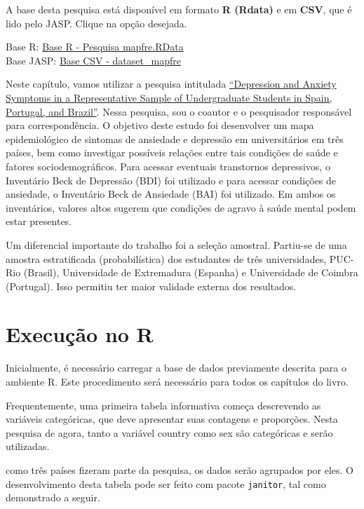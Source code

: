\documentclass[
]{book}
\begin{document}
A base desta pesquisa está disponível em formato \textbf{R (Rdata)} e em \textbf{CSV}, que é lido pelo JASP. Clique na opção desejada.

Base R: \href{https://github.com/anovabr/mqt/raw/master/bases/Base\%20R\%20-\%20Pesquisa\%20mapfre.RData}{Base R - Pesquisa mapfre.RData}\\
Base JASP: \href{https://github.com/anovabr/mqt/raw/master/bases/bases_csv_jasp.zip}{Base CSV - dataset\_mapfre}

Neste capítulo, vamos utilizar a pesquisa intitulada \href{https://doi.org/10.1590/0102.3772e36412}{``Depression and Anxiety Symptoms in a Representative Sample of Undergraduate Students in Spain, Portugal, and Brazil''}. Nessa pesquisa, sou o coautor e o pesquisador responsável para correspondência. O objetivo deste estudo foi desenvolver um mapa epidemiológico de sintomas de ansiedade e depressão em universitários em três países, bem como investigar possíveis relações entre tais condições de saúde e fatores sociodemográficos. Para acessar eventuais transtornos depressivos, o Inventário Beck de Depressão (BDI) foi utilizado e para acessar condições de ansiedade, o Inventário Beck de Ansiedade (BAI) foi utilizado. Em ambos os inventários, valores altos sugerem que condições de agravo à saúde mental podem estar presentes.

Um diferencial importante do trabalho foi a seleção amostral. Partiu-se de uma amostra estratificada (probabilística) dos estudantes de três universidades, PUC-Rio (Brasil), Universidade de Extremadura (Espanha) e Universidade de Coimbra (Portugal). Isso permitiu ter maior validade externa dos resultados.

\hypertarget{execuuxe7uxe3o-no-r}{%
\section{Execução no R}\label{execuuxe7uxe3o-no-r}}

Inicialmente, é necessário carregar a base de dados previamente descrita para o ambiente R. Este procedimento será necessário para todos os capítulos do livro.

Frequentemente, uma primeira tabela informativa começa descrevendo as variáveis categóricas, que deve apresentar suas contagens e proporções. Nesta pesquisa de agora, tanto a variável country como sex são categóricas e serão utilizadas.

como três países fizeram parte da pesquisa, os dados serão agrupados por eles. O desenvolvimento desta tabela pode ser feito com pacote \texttt{janitor}, tal como demonstrado a seguir.
\end{document}
